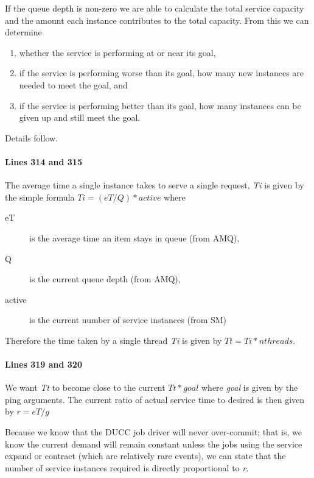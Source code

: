     If the queue depth is non-zero we are able to calculate the total
    service capacity and the amount each instance contributes to the
    total capacity.  From this we can determine 
    \begin{enumerate}
      \item whether the service is performing at or near its goal, 
      \item if the service is performing worse than its goal, how many
        new instances are needed to meet the goal, and
      \item if the service is performing better than its goal, how many
        instances can be given up and still meet the goal.
   \end{enumerate}

   Details follow.

   \paragraph{Lines 314 and 315}
   The average time a single instance takes to serve a single request, {\em Ti}  is given
   by the simple formula \( Ti = (eT / Q) * active \) where
   \begin{description}
     \item[eT] is the average time an item stays in queue (from AMQ),
     \item[Q] is the current queue depth (from AMQ),
     \item[active] is the current number of service instances (from SM)
   \end{description}

   Therefore the time taken by a single thread {\em Ti} is given by 
   \( Tt = Ti * nthreads \).
     
   \paragraph{Lines 319 and 320}
   We want {\em Tt} to become close to the current
   \(Tt * goal\) where {\em goal} is given by the ping arguments.  The 
   current ratio of actual service time to desired is then given by
   \( r = eT / g \)

   Because we know that the DUCC job driver will never over-commit; that is,
   we know the current demand will remain constant unless the jobs using the
   service expand or contract (which are relatively rare events), we can state
   that the number of service instances required is directly proportional
   to {\em r}.  

